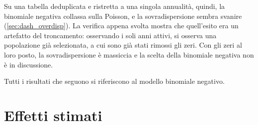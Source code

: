 Su una tabella deduplicata e ristretta a una singola annualità, quindi,
la binomiale negativa collassa
sulla Poisson, e la sovradispersione sembra svanire  (\cref{sec:dash_overdisp}). La verifica appena svolta
mostra che quell'esito era un artefatto del troncamento: osservando i soli anni attivi,
si osserva una popolazione già selezionata, a cui sono già stati rimossi gli zeri.
Con gli zeri al loro posto, la sovradispersione è massiccia e la scelta della
binomiale negativa non è in discussione.

Tutti i risultati che seguono si riferiscono al modello binomiale negativo.

\section{Effetti stimati}
\label{sec:glm_effects}

